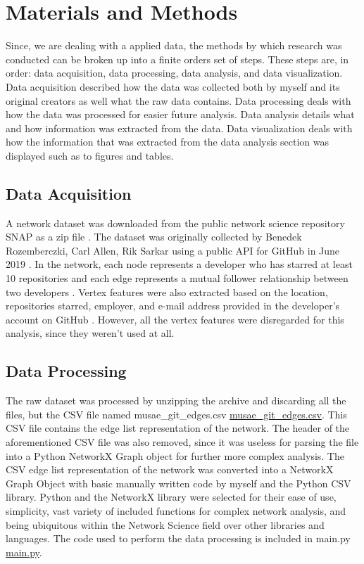 \documentclass[9pt,twocolumn,twoside]{pnas-new}
\begin{document}
\section{Materials and Methods}{
Since, we are dealing with a applied data, the methods by which research was conducted can be broken up into a finite orders set of steps. These steps are, in order: data acquisition, data processing, data analysis, and data visualization. Data acquisition described how the data was collected both by myself and its original creators as well what the raw data contains. Data processing deals with how the data was processed for easier future analysis. Data analysis details what and how information was extracted from the data. Data visualization deals with how the information that was extracted from the data analysis section was displayed such as to figures and tables.

\subsection{Data Acquisition} A network dataset was downloaded from the public network science repository SNAP as a zip file \cite{rozemberczki2019multiscale}. The dataset was originally collected by Benedek Rozemberczki, Carl Allen, Rik Sarkar using a public API for GitHub in June 2019 \cite{rozemberczki2019multiscale}. In the network, each node represents a developer who has starred at least 10 repositories and each edge represents a mutual follower relationship between two developers \cite{rozemberczki2019multiscale}. Vertex features were also extracted based on the location, repositories starred, employer, and e-mail address provided in the developer’s account on GitHub \cite{rozemberczki2019multiscale}. However, all the vertex features were disregarded for this analysis, since they weren’t used at all.

\subsection{Data Processing} The raw dataset was processed by unzipping the archive and discarding all the files, but the CSV file named musae\_git\_edges.csv \href{https://github.com/Hockenba/mth450-final-project-report}{musae\_git\_edges.csv}. This CSV file contains the edge list representation of the network. The header of the aforementioned CSV file was also removed, since it was useless for parsing the file into a Python NetworkX Graph object for further more complex analysis. The CSV edge list representation of the network was converted into a NetworkX Graph Object with basic manually written code by myself and the Python CSV library. Python and the NetworkX library were selected for their ease of use, simplicity, vast variety of included functions for complex network analysis, and being ubiquitous within the Network Science field over other libraries and languages. The code used to perform the data processing is included in main.py \href{https://github.com/Hockenba/mth450-final-project-report}{main.py}.

}
\end{document}
